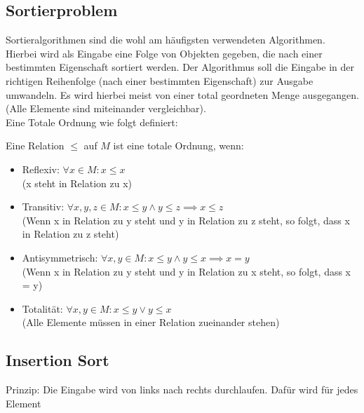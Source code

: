 \documentclass[ngerman,
color=3b,
load_common, %
boxarc,
main,
tikz,
border=3mm
]{article}
\begin{document}
\subsection{Sortierproblem}
Sortieralgorithmen sind die wohl am häufigsten verwendeten Algorithmen. Hierbei wird als Eingabe eine Folge von Objekten gegeben, die nach einer bestimmten Eigenschaft sortiert werden. Der Algorithmus soll die Eingabe in der richtigen Reihenfolge (nach einer bestimmten Eigenschaft) zur Ausgabe umwandeln. Es wird hierbei meist von einer total geordneten Menge ausgegangen. (Alle Elemente sind miteinander vergleichbar). \\
Eine Totale Ordnung wie folgt definiert:
\begin{center}
    Eine Relation $\leq$ auf $M$ ist eine totale Ordnung, wenn:
    \begin{itemize}
        \item Reflexiv: $\forall x \in M: x \leq x$ \\
        (x steht in Relation zu x)
        \item Transitiv: $\forall x,y,z \in M: x \leq y \wedge y \leq z \implies x \leq z$ \\
        (Wenn x in Relation zu y steht und y in Relation zu z steht, so folgt, dass x in Relation zu z steht)
        \item Antisymmetrisch: $\forall x,y \in M: x \leq y \wedge y \leq x \implies x = y$ \\
        (Wenn x in Relation zu y steht und y in Relation zu x steht, so folgt, dass x = y)
        \item Totalität: $\forall x,y \in M: x \leq y \vee y \leq x$ \\
        (Alle Elemente müssen in einer Relation zueinander stehen)
    \end{itemize}
\end{center}

\newpage
\subsection{Insertion Sort}
\begin{algorithm}
    \DontPrintSemicolon

     {
    }
\end{algorithm}
Prinzip: Die Eingabe wird von links nach rechts durchlaufen. Dafür wird für jedes Element 
\end{document}
